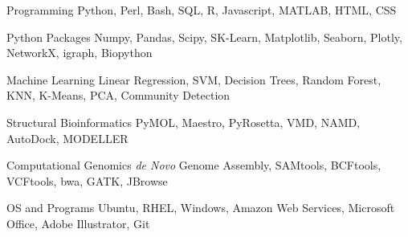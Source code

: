 \vspace{2mm}

\begin{cvskills}

  \cvskill
    {Programming} %
    {Python, Perl, Bash, SQL, R, Javascript, MATLAB, HTML, CSS} %

  \cvskill
    {Python Packages} %
    {Numpy, Pandas, Scipy, SK-Learn, Matplotlib, Seaborn, Plotly, NetworkX, igraph, Biopython} %
    
  \cvskill
    {Machine Learning} %
    {Linear Regression, SVM, Decision Trees, Random Forest, KNN, K-Means, PCA, Community Detection} %
    
  \cvskill
    {Structural Bioinformatics} %
    {PyMOL, Maestro, PyRosetta, VMD, NAMD, AutoDock, MODELLER} %

  \cvskill
    {Computational Genomics} %
    {\textit{de Novo} Genome Assembly, SAMtools, BCFtools, VCFtools, bwa, GATK, JBrowse} %

  \cvskill
    {OS and Programs} %
    {Ubuntu, RHEL, Windows, Amazon Web Services, Microsoft Office, Adobe Illustrator, Git} %
    
\vspace{-8.0mm}
\end{cvskills}
